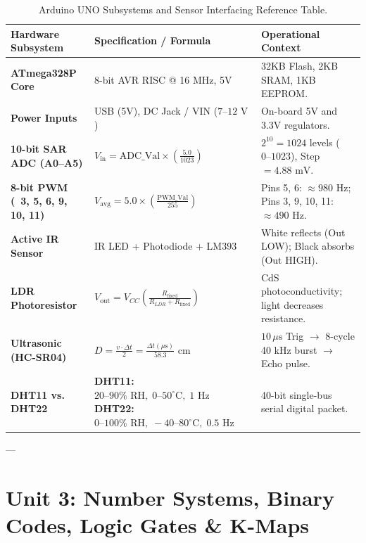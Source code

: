 \begin{table}[htbp]
\centering
\small
\begin{tabularx}{\textwidth}{lXX}
\toprule
\textbf{Hardware Subsystem} & \textbf{Specification / Formula} & \textbf{Operational Context} \\
\midrule
\textbf{ATmega328P Core} & 8-bit AVR RISC @ 16 MHz, 5V & 32KB Flash, 2KB SRAM, 1KB EEPROM. \\
\textbf{Power Inputs} & USB (5V), DC Jack / VIN ($7\text{--}12\text{ V}$) & On-board 5V and 3.3V regulators. \\
\textbf{10-bit SAR ADC (A0–A5)} & $V_{\text{in}} = \text{ADC\_Val} \times \left(\frac{5.0}{1023}\right)$ & $2^{10} = 1024$ levels ($0\text{--}1023$), Step $= 4.88\text{ mV}$. \\
\textbf{8-bit PWM (~3, 5, 6, 9, 10, 11)} & $V_{\text{avg}} = 5.0 \times \left(\frac{\text{PWM\_Val}}{255}\right)$ & Pins 5, 6: $\approx 980\text{ Hz}$; Pins 3, 9, 10, 11: $\approx 490\text{ Hz}$. \\
\textbf{Active IR Sensor} & IR LED + Photodiode + LM393 & White reflects (Out LOW); Black absorbs (Out HIGH). \\
\textbf{LDR Photoresistor} & $V_{\text{out}} = V_{CC}\left(\frac{R_{\text{fixed}}}{R_{LDR} + R_{\text{fixed}}}\right)$ & CdS photoconductivity; light decreases resistance. \\
\textbf{Ultrasonic (HC-SR04)} & $D = \frac{v \cdot \Delta t}{2} = \frac{\Delta t(\mu\text{s})}{58.3}\text{ cm}$ & $10\,\mu\text{s}$ Trig $\rightarrow$ 8-cycle 40 kHz burst $\rightarrow$ Echo pulse. \\
\textbf{DHT11 vs. DHT22} & \makecell[l]{\textbf{DHT11:} $20\text{--}90\%\text{ RH}, \; 0\text{--}50^\circ\text{C}, \; 1\text{ Hz}$\\\textbf{DHT22:} $0\text{--}100\%\text{ RH}, \; -40\text{--}80^\circ\text{C}, \; 0.5\text{ Hz}$} & 40-bit single-bus serial digital packet. \\
\bottomrule
\end{tabularx}
\caption{Arduino UNO Subsystems and Sensor Interfacing Reference Table.}
\label{tab:rev-unit2}
\end{table}

---

\section{Unit 3: Number Systems, Binary Codes, Logic Gates \& K-Maps}

